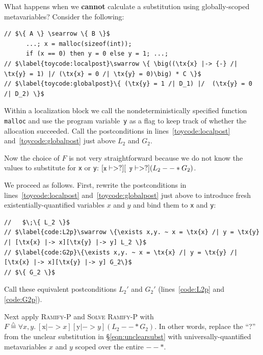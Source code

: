 \documentclass[acmsmall,screen]{acmart}
\newcommand{\li}[1]{{\texttt{\small #1}}}
\newcommand\hide[1]{}
\newcommand{\defeq}{\mathbin{\stackrel{\triangle}{=}}}
\newcommand{\tx}[1]{\text{#1}}
\newcommand{\infrulestyle}[1]{\textsc{#1}}
\begin{document}
{What happens when we \textbf{cannot} calculate a substitution using globally-scoped metavariables?  Consider the following: \begin{lstlisting}
// $\{ A \} \searrow \{ B \}$
      ...; x = malloc(sizeof(int));
      if (x == 0) then y = 0 else y = 1; ...;
// $\label{toycode:localpost}\swarrow \{ \big((\tx{x} |-> {-} /| \tx{y} = 1) |/ (\tx{x} = 0 /| \tx{y} = 0)\big) * C \}$
// $\label{toycode:globalpost}\{ (\tx{y} = 1 /| D_1) |/  (\tx{y} = 0 /| D_2) \}$
\end{lstlisting}
\vspace*{-1.5ex}
Within a localization block we call the nondeterministically specified function \li{malloc} and use the program variable~\li{y} as a flag to keep track of whether the allocation succeeded.  Call the postconditions in lines~\ref{toycode:localpost} and~\ref{toycode:globalpost} just above $L_2$ and $G_2$. 

Now the choice of $F$ is not very straightforward because we do not know the values to substitute for \li{x} or \li{y}: $[\li{x} |-> ?][\li{y} |-> ?] (L_2 --* G_2)$. \label{eqn:unclearsubst}

\hide{
\vspace*{-1.5ex}
\begin{equation}
\label{eqn:unclearsubst}
[\li{x} |-> ?][\li{y} |-> ?] (L_2 --* G_2)
\vspace*{-1.5ex}
\end{equation}
} 

We proceed as follows.  First, rewrite the postconditions in lines~\ref{toycode:localpost} and~\ref{toycode:globalpost} just above to introduce fresh existentially-quantified  variables $x$ and $y$ and bind them to \li{x} and \li{y}:
\begin{lstlisting}[firstnumber=4]
//   $\;\{ L_2 \}$
// $\label{code:L2p}\swarrow \{\exists x,y. ~ x = \tx{x} /| y = \tx{y} /| [\tx{x} |-> x][\tx{y} |-> y] L_2 \}$
// $\label{code:G2p}\{\exists x,y. ~ x = \tx{x} /| y = \tx{y} /| [\tx{x} |-> x][\tx{y} |-> y] G_2\}$
// $\{ G_2 \}$
\end{lstlisting}
Call these equivalent postconditions $L_2'$ and $G_2'$ (lines~\ref{code:L2p} and
\ref{code:G2p}).




Next apply \infrulestyle{Ramify-P} and \infrulestyle{Solve Ramify-P} with
$F \defeq \forall x, y.~ [\tx{x} |-> x][\tx{y} |-> y](L_2 --* G_2)$.
In other words, replace the ``?'' from the unclear substitution in
\S\ref{eqn:unclearsubst} with universally-quantified metavariables $x$ and $y$ scoped over the entire $--*$.

}
\end{document}
